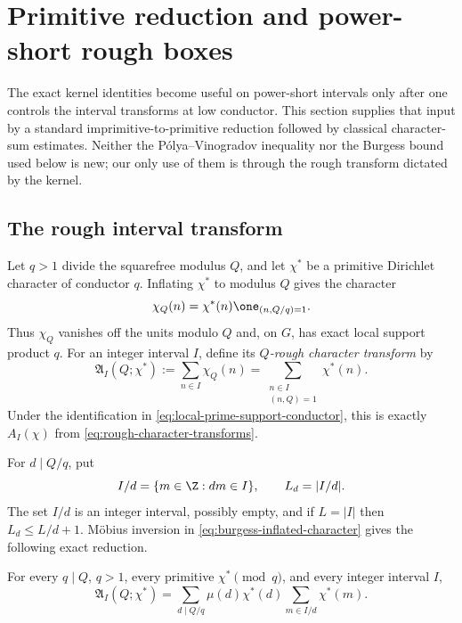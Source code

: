 \section{Primitive reduction and power-short rough boxes}
\label{sec:burgess-power-short}

The exact kernel identities become useful on power-short intervals only after
one controls the interval transforms at low conductor.  This section supplies
that input by a standard imprimitive-to-primitive reduction followed by
classical character-sum estimates.  Neither the P\'olya--Vinogradov inequality
nor the Burgess bound used below is new; our only use of them is through the
rough transform dictated by the kernel.

\subsection{The rough interval transform}
\label{subsec:burgess-rough-transform}

Let $q>1$ divide the squarefree modulus $Q$, and let $\chi^*$ be a primitive
Dirichlet character of conductor $q$.  Inflating $\chi^*$ to modulus $Q$
gives the character
\begin{equation}\label{eq:burgess-inflated-character}
 \chi_Q(n)=\chi^*(n)\one_{(n,Q/q)=1}.
\end{equation}
Thus $\chi_Q$ vanishes off the units modulo $Q$ and, on $G$, has exact local
support product $q$.  For an integer interval $I$, define its
\emph{$Q$-rough character transform} by
\begin{equation}\label{eq:burgess-rough-interval-transform}
 \mathfrak A_I(Q;\chi^*)
 :=\sum_{n\in I}\chi_Q(n)
 =\sum_{\substack{n\in I\\(n,Q)=1}}\chi^*(n).
\end{equation}
Under the identification in \eqref{eq:local-prime-support-conductor}, this is
exactly $A_I(\chi)$ from \eqref{eq:rough-character-transforms}.

For $d\mid Q/q$, put
\begin{equation}\label{eq:burgess-dilated-interval}
 I/d=\{m\in\Z:dm\in I\},
 \qquad L_d=|I/d|.
\end{equation}
The set $I/d$ is an integer interval, possibly empty, and if $L=|I|$ then
$L_d\le L/d+1$.  M\"obius inversion in \eqref{eq:burgess-inflated-character}
gives the following exact reduction.

\begin{lemma}
\label{lem:burgess-mobius-reduction}
For every $q\mid Q$, $q>1$, every primitive $\chi^*\pmod q$, and every
integer interval $I$,
\begin{equation}\label{eq:burgess-mobius-reduction}
 \mathfrak A_I(Q;\chi^*)
 =\sum_{d\mid Q/q}\mu(d)\chi^*(d)
   \sum_{m\in I/d}\chi^*(m).
\end{equation}
\end{lemma}

